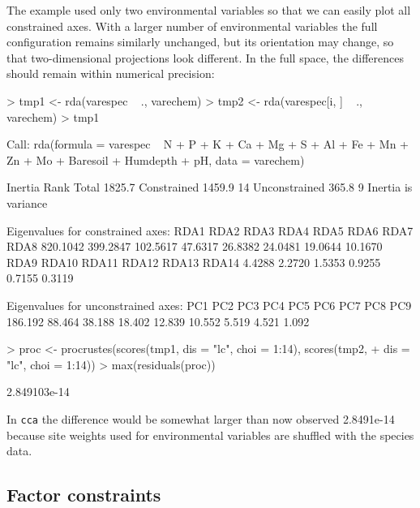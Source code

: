 \documentclass[a4paper]{article}
\begin{document}
The example used only two environmental variables so that we can
easily plot all constrained axes.  With a larger number of
environmental variables the full configuration remains similarly
unchanged, but its orientation may change, so that two-dimensional
projections look different.  In the full space, the differences should
remain within numerical precision:
\begin{Schunk}
\begin{Sinput}
> tmp1 <- rda(varespec ~ ., varechem)
> tmp2 <- rda(varespec[i, ] ~ ., varechem)
> tmp1
\end{Sinput}
\begin{Soutput}
Call:
rda(formula = varespec ~ N + P + K + Ca + Mg + S + Al + Fe +      Mn + Zn + Mo + Baresoil + Humdepth + pH, data = varechem) 

              Inertia Rank
Total          1825.7     
Constrained    1459.9   14
Unconstrained   365.8    9
Inertia is variance 

Eigenvalues for constrained axes:
    RDA1     RDA2     RDA3     RDA4     RDA5     RDA6     RDA7     RDA8 
820.1042 399.2847 102.5617  47.6317  26.8382  24.0481  19.0644  10.1670 
    RDA9    RDA10    RDA11    RDA12    RDA13    RDA14 
  4.4288   2.2720   1.5353   0.9255   0.7155   0.3119 

Eigenvalues for unconstrained axes:
    PC1     PC2     PC3     PC4     PC5     PC6     PC7     PC8     PC9 
186.192  88.464  38.188  18.402  12.839  10.552   5.519   4.521   1.092 
\end{Soutput}
\begin{Sinput}
> proc <- procrustes(scores(tmp1, dis = "lc", choi = 1:14), scores(tmp2, 
+     dis = "lc", choi = 1:14))
> max(residuals(proc))
\end{Sinput}
\begin{Soutput}
[1] 2.849103e-14
\end{Soutput}
\end{Schunk}
In \texttt{cca} the difference would be somewhat larger than now
observed 2.8491e-14 because site
weights used for environmental variables are shuffled with the species
data.

\subsection{Factor constraints}
\end{document}
